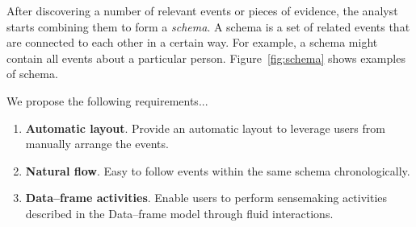 After discovering a number of relevant events or pieces of evidence, the analyst starts combining them to form a \textit{schema}. A schema is a set of related events that are connected to each other in a certain way. For example, a schema might contain all events about a particular person. Figure~\ref{fig:schema} shows examples of schema. 

We propose the following requirements...
\begin{enumerate}
	\item \textbf{Automatic layout}. Provide an automatic layout to leverage users from manually arrange the events.
	\item \textbf{Natural flow}. Easy to follow events within the same schema chronologically.
	\item \textbf{Data--frame activities}. Enable users to perform sensemaking activities described in the Data--frame model through fluid interactions.
\end{enumerate}

